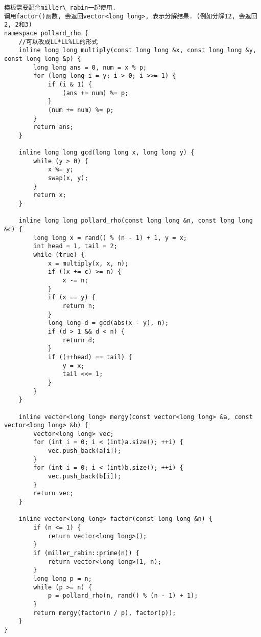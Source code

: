 \begin{lstlisting}
模板需要配合miller\_rabin一起使用.
调用factor()函数, 会返回vector<long long>, 表示分解结果. (例如分解12, 会返回2, 2和3)
namespace pollard_rho {
	//可以改成LL*LL%LL的形式
	inline long long multiply(const long long &x, const long long &y, const long long &p) {
		long long ans = 0, num = x % p;
		for (long long i = y; i > 0; i >>= 1) {
			if (i & 1) {
				(ans += num) %= p;
			}
			(num += num) %= p;
		}
		return ans;
	}
 
	inline long long gcd(long long x, long long y) {
		while (y > 0) {
			x %= y;
			swap(x, y);
		}
		return x;
	}
 
	inline long long pollard_rho(const long long &n, const long long &c) {
		long long x = rand() % (n - 1) + 1, y = x;
		int head = 1, tail = 2;
		while (true) {
			x = multiply(x, x, n);
			if ((x += c) >= n) {
				x -= n;
			}
			if (x == y) {
				return n;
			}
			long long d = gcd(abs(x - y), n);
			if (d > 1 && d < n) {
				return d;
			}
			if ((++head) == tail) {
				y = x;
				tail <<= 1;
			}
		}
	}
 
	inline vector<long long> mergy(const vector<long long> &a, const vector<long long> &b) {
		vector<long long> vec;
		for (int i = 0; i < (int)a.size(); ++i) {
			vec.push_back(a[i]);
		}
		for (int i = 0; i < (int)b.size(); ++i) {
			vec.push_back(b[i]);
		}
		return vec;
	}
 
	inline vector<long long> factor(const long long &n) {
		if (n <= 1) {
			return vector<long long>();
		}
		if (miller_rabin::prime(n)) {
			return vector<long long>(1, n);
		}
		long long p = n;
		while (p >= n) {
			p = pollard_rho(n, rand() % (n - 1) + 1);
		}
		return mergy(factor(n / p), factor(p));
	}
}
\end{lstlisting}
